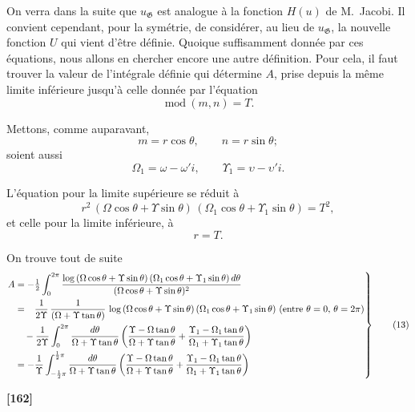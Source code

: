 \documentclass[11pt,a4paper]{book}
\providecommand{\modd}{\ \mathrm{mod}\ }
\begin{document}
On verra dans la suite que $u_{\mathfrak{G}}$ est analogue \`a la fonction $H(u)$ de M.~Jacobi. Il
convient cependant, pour la sym\'etrie, de consid\'erer, au lieu de $u_{\mathfrak{G}}$, la nouvelle fonction
$U$ qui vient d'\^etre d\'efinie. Quoique suffisamment donn\'ee par ces \'equations, nous
allons en chercher encore une autre d\'efinition. Pour cela, il faut trouver la valeur
de l'int\'egrale d\'efinie qui d\'etermine $A$, prise depuis la m\^eme limite inf\'erieure jusqu'\`a
celle donn\'ee par l'\'equation
\[\modd(m, n) = T.\]

Mettons, comme auparavant,
\[m = r\cos\theta,\qquad n = r\sin\theta;\]
soient aussi
\[\Omega_1 = \omega - \omega'i,\qquad \Upsilon_1 = \upsilon - \upsilon'i.\]

L'\'equation pour la limite sup\'erieure se r\'eduit \`a
\[r^2\, (\Omega\cos\theta + \Upsilon\sin\theta)\, (\Omega_1\cos\theta + \Upsilon_1\sin\theta) = T^2,\]
et celle pour la limite inf\'erieure, \`a
\[r = T.\]

On trouve tout de suite
\begin{equation}
\left.
\begin{aligned}
A &= -\tfrac{1}{2} \int_0^{2\pi} \frac{\log\, (\Omega\cos\theta + \Upsilon\sin\theta)\, (\Omega_1\cos\theta + \Upsilon_1\sin\theta)\, d\theta}{(\Omega\cos\theta + \Upsilon\sin\theta)^2}\\
&= \hphantom{-}\frac{1}{2\Upsilon}\, \frac{1}{(\Omega + \Upsilon\tan\theta)}\, \log\, (\Omega\cos\theta + \Upsilon\sin\theta)\, (\Omega_1\cos\theta + \Upsilon_1\sin\theta)\ \text{(entre $\theta = 0$, $\theta = 2\pi$)}\\
&\quad - \frac{1}{2\Upsilon} \int_0^{2\pi} \frac{d\theta}{\Omega + \Upsilon\tan\theta}\left(\frac{\Upsilon - \Omega\tan\theta}{\Omega + \Upsilon\tan\theta} + \frac{\Upsilon_1 - \Omega_1\tan\theta}{\Omega_1 + \Upsilon_1\tan\theta}\right)\\
&= -\frac{1}{\Upsilon} \int_{-\frac{1}{2}\pi}^{\frac{1}{2}\pi} \frac{d\theta}{\Omega + \Upsilon\tan\theta}\left(\frac{\Upsilon - \Omega\tan\theta}{\Omega + \Upsilon\tan\theta} + \frac{\Upsilon_1 - \Omega_1\tan\theta}{\Omega_1 + \Upsilon_1\tan\theta}\right)
\end{aligned}
\right\} \tag{13}
\end{equation}

\textbf{[162]}
\end{document}
